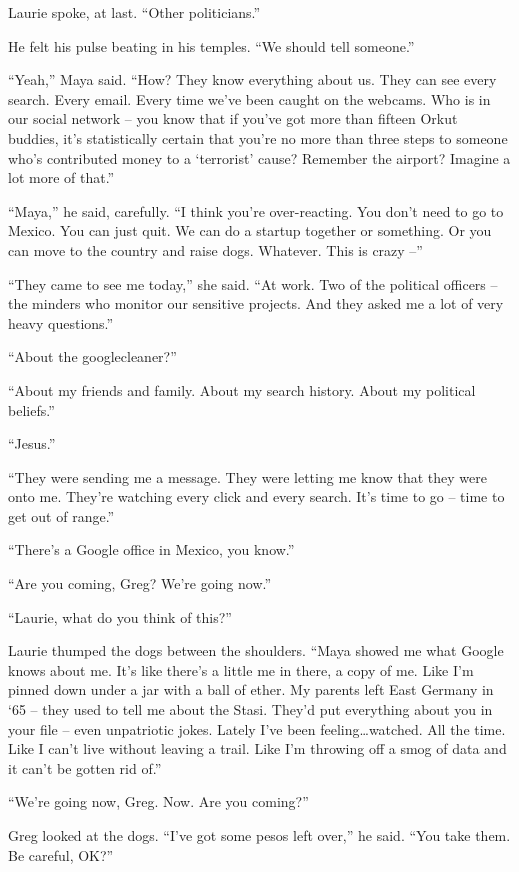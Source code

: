 Laurie spoke, at last. “Other politicians.”

He felt his pulse beating in his temples. “We should tell someone.”

“Yeah,” Maya said. “How? They know everything about us. They can 
see every search. Every email. Every time we've been caught on the 
webcams. Who is in our social network -- you know that if you've got 
more than fifteen Orkut buddies, it's statistically certain that you're 
no more than three steps to someone who's contributed money to a 
`terrorist' cause? Remember the airport? Imagine a lot more of that.”

“Maya,” he said, carefully. “I think you're over-reacting. You 
don't need to go to Mexico. You can just quit. We can do a startup 
together or something. Or you can move to the country and raise dogs. 
Whatever. This is crazy --”

“They came to see me today,” she said. “At work. Two of the 
political officers -- the minders who monitor our sensitive projects. 
And they asked me a lot of very heavy questions.”

“About the googlecleaner?”

“About my friends and family. About my search history. About my 
political beliefs.”

“Jesus.”

“They were sending me a message. They were letting me know that they 
were onto me. They're watching every click and every search. It's time 
to go -- time to get out of range.”

“There's a Google office in Mexico, you know.”

“Are you coming, Greg? We're going now.”

“Laurie, what do you think of this?”

Laurie thumped the dogs between the shoulders. “Maya showed me what 
Google knows about me. It's like there's a little me in there, a copy 
of me. Like I'm pinned down under a jar with a ball of ether. My 
parents left East Germany in `65 -- they used to tell me about the 
Stasi. They'd put everything about you in your file -- even unpatriotic 
jokes. Lately I've been feeling\ldots{}watched. All the time. Like I can't 
live without leaving a trail. Like I'm throwing off a smog of data and 
it can't be gotten rid of.”

“We're going now, Greg. Now. Are you coming?”

Greg looked at the dogs. “I've got some pesos left over,” he said. 
“You take them. Be careful, OK?”

